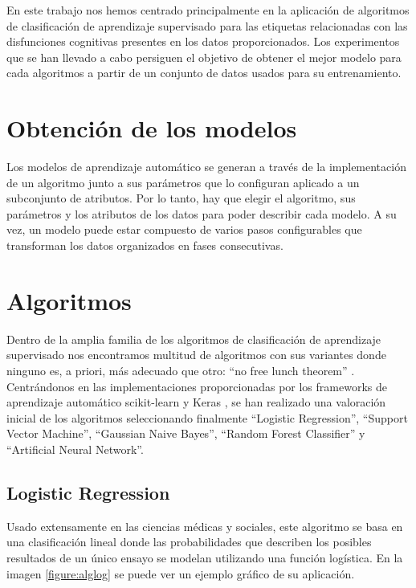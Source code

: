 En este trabajo nos hemos centrado principalmente en la aplicación de algoritmos de clasificación de aprendizaje supervisado para las etiquetas relacionadas con las disfunciones cognitivas presentes en los datos proporcionados. Los experimentos que se han llevado a cabo persiguen el objetivo de obtener el mejor modelo para cada algoritmos a partir de un conjunto de datos usados para su entrenamiento.

\section{Obtención de los modelos}

Los modelos de aprendizaje automático se generan a través de la implementación de un algoritmo junto a sus parámetros que lo configuran aplicado a un subconjunto de atributos. Por lo tanto, hay que elegir el algoritmo, sus parámetros y los atributos de los datos para poder describir cada modelo. A su vez, un modelo puede estar compuesto de varios pasos configurables que transforman los datos organizados en fases consecutivas.

\section{Algoritmos}

Dentro de la amplia familia de los algoritmos de clasificación de aprendizaje supervisado nos encontramos multitud de algoritmos con sus variantes donde ninguno es, a priori, más adecuado que otro: ``no free lunch theorem'' \cite{Wolpert1996TheAlgorithms}. Centrándonos en las implementaciones proporcionadas por los frameworks de aprendizaje automático scikit-learn \cite{Scikit-learn:Documentation} y Keras \cite{KerasDocumentation}, se han realizado una valoración inicial de los algoritmos seleccionando finalmente ``Logistic Regression'', ``Support Vector Machine'', ``Gaussian Naive Bayes'', ``Random Forest Classifier'' y ``Artificial Neural Network''.

\subsection{Logistic Regression}
Usado extensamente en las ciencias médicas y sociales, este algoritmo se basa en una clasificación  lineal donde las probabilidades que describen los posibles resultados de un único ensayo se modelan utilizando una función logística. En la imagen \ref{figure:alglog} se puede ver un ejemplo gráfico de su aplicación.


